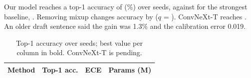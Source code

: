 \documentclass{article}
\begin{document}
Our model reaches a top-1 accuracy of \AccOurs{} (\AccOursPct\%) over \NSeeds{} seeds, against \AccBase{}
for the strongest baseline, \BestBase. Removing mixup changes accuracy by \DeltaMixup{} ($q$ = \QMixup).
ConvNeXt-T reaches \AccConvNeXt.
An older draft sentence said the gain was 1.3\% and the calibration error 0.019.

\begin{table}[h]
\centering
\caption{Top-1 accuracy over \NSeeds{} seeds; best value per column in bold. ConvNeXt-T is pending.}
\begin{tabular}{lccc}
\toprule
Method & Top-1 acc. & ECE & Params (M) \\
\midrule

\end{tabular}
\end{table}
\end{document}
